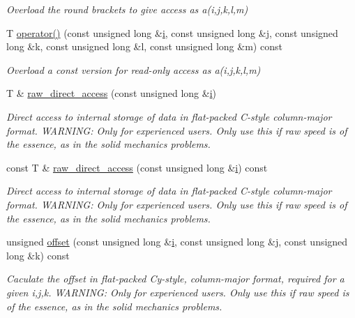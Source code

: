 \begin{DoxyCompactItemize}
\begin{DoxyCompactList}\small\item\em Overload the round brackets to give access as a(i,j,k,l,m) \end{DoxyCompactList}\item 
T \hyperlink{classoomph_1_1RankFiveTensor_a0d2ef9d9bcc8103b2d60f768ffa60532}{operator()} (const unsigned long \&\hyperlink{cfortran_8h_adb50e893b86b3e55e751a42eab3cba82}{i}, const unsigned long \&j, const unsigned long \&k, const unsigned long \&l, const unsigned long \&m) const
\begin{DoxyCompactList}\small\item\em Overload a const version for read-\/only access as a(i,j,k,l,m) \end{DoxyCompactList}\item 
T \& \hyperlink{classoomph_1_1RankFiveTensor_aa349a95c9ee9aa66950f1ed88532498c}{raw\+\_\+direct\+\_\+access} (const unsigned long \&\hyperlink{cfortran_8h_adb50e893b86b3e55e751a42eab3cba82}{i})
\begin{DoxyCompactList}\small\item\em Direct access to internal storage of data in flat-\/packed C-\/style column-\/major format. W\+A\+R\+N\+I\+NG\+: Only for experienced users. Only use this if raw speed is of the essence, as in the solid mechanics problems. \end{DoxyCompactList}\item 
const T \& \hyperlink{classoomph_1_1RankFiveTensor_a15c5e1c7dee4142962716be02accb1a0}{raw\+\_\+direct\+\_\+access} (const unsigned long \&\hyperlink{cfortran_8h_adb50e893b86b3e55e751a42eab3cba82}{i}) const
\begin{DoxyCompactList}\small\item\em Direct access to internal storage of data in flat-\/packed C-\/style column-\/major format. W\+A\+R\+N\+I\+NG\+: Only for experienced users. Only use this if raw speed is of the essence, as in the solid mechanics problems. \end{DoxyCompactList}\item 
unsigned \hyperlink{classoomph_1_1RankFiveTensor_ab3bd11afa49e36ff28c1d4968796f5a3}{offset} (const unsigned long \&\hyperlink{cfortran_8h_adb50e893b86b3e55e751a42eab3cba82}{i}, const unsigned long \&j, const unsigned long \&k) const
\begin{DoxyCompactList}\small\item\em Caculate the offset in flat-\/packed Cy-\/style, column-\/major format, required for a given i,j,k. W\+A\+R\+N\+I\+NG\+: Only for experienced users. Only use this if raw speed is of the essence, as in the solid mechanics problems. \end{DoxyCompactList}\end{DoxyCompactItemize}
